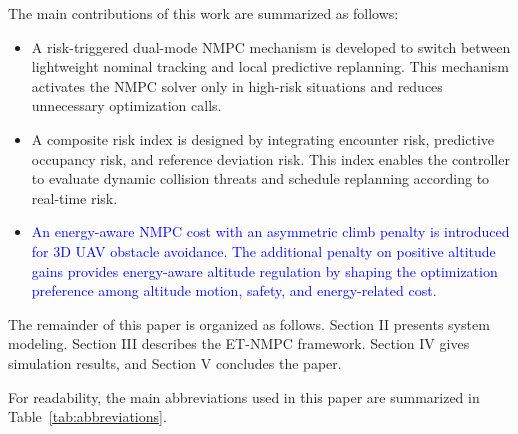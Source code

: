\documentclass[lettersize,journal]{IEEEtran}
\begin{document}
The main contributions of this work are summarized as follows:
\begin{itemize}
	\item A risk-triggered dual-mode NMPC mechanism is developed to switch between lightweight nominal tracking and local predictive replanning. This mechanism activates the NMPC solver only in high-risk situations and reduces unnecessary optimization calls.
	
	\item A composite risk index is designed by integrating encounter risk, predictive occupancy risk, and reference deviation risk. This index enables the controller to evaluate dynamic collision threats and schedule replanning according to real-time risk.
	
	\item \textcolor{blue}{An energy-aware NMPC cost with an asymmetric climb penalty is introduced for 3D UAV obstacle avoidance. The additional penalty on positive altitude gains provides energy-aware altitude regulation by shaping the optimization preference among altitude motion, safety, and energy-related cost.}
\end{itemize}

The remainder of this paper is organized as follows. Section II presents system modeling. Section III describes the ET-NMPC framework. Section IV gives simulation results, and Section V concludes the paper.

For readability, the main abbreviations used in this paper are summarized in Table~\ref{tab:abbreviations}.
\end{document}
